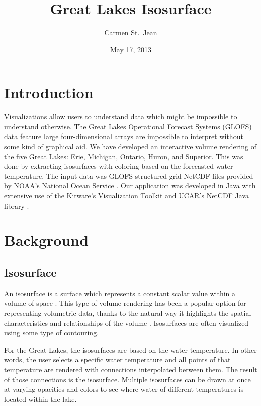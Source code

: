 \documentclass{article} %
\begin{document}

\title{Great Lakes Isosurface}
\date{May 17, 2013}
\author{Carmen St.\ Jean}


\maketitle

\section{Introduction}

Visualizations allow users to understand data which might be impossible to understand otherwise.  The Great Lakes Operational Forecast Systems (GLOFS) data feature large four-dimensional arrays are impossible to interpret without some kind of graphical aid.  We have developed an interactive volume rendering of the five Great Lakes: Erie, Michigan, Ontario, Huron, and Superior.  This was done by extracting isosurfaces with coloring based on the forecasted water temperature.  The input data was GLOFS structured grid NetCDF files provided by NOAA's National Ocean Service \cite{glofs}.  Our application was developed in Java with extensive use of the Kitware's Visualization Toolkit \cite{vtk} and UCAR's NetCDF Java library \cite{netcdf}.

\section{Background}

\subsection{Isosurface}

An isosurface is a surface which represents a constant scalar value within a volume of space \cite[p. 803] {vtkGuide}.  This type of volume rendering has been a popular option for representing volumetric data, thanks to the natural way it highlights the spatial characteristics and relationships of the volume \cite{meissnerVolume}.  Isosurfaces are often visualized using some type of contouring.

For the Great Lakes, the isosurfaces are based on the water temperature.  In other words, the user selects a specific water temperature and all points of that temperature are rendered with connections interpolated between them.  The result of those connections is the isosurface.  Multiple isosurfaces can be drawn at once at varying opacities and colors to see where water of different temperatures is located within the lake.
\end{document}
